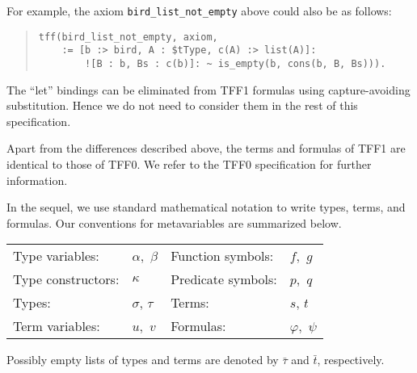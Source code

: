 %
For example, the axiom \verb+bird_list_not_empty+ above could also be as
follows:
\begin{quote}
\begin{verbatim}
tff(bird_list_not_empty, axiom,
    := [b :> bird, A : $tType, c(A) :> list(A)]:
        ![B : b, Bs : c(b)]: ~ is_empty(b, cons(b, B, Bs))).
\end{verbatim}
\end{quote}
%
The ``let'' bindings can be eliminated from TFF1 formulas using capture-avoiding
substitution. Hence we do not need to consider them in the rest of this
specification.

 Apart from the differences described above,
the terms and formulas of TFF1 are identical to those of TFF0. We refer to the
TFF0 specification \cite{TFF0} for further information.

 In the sequel, we use standard
mathematical notation to write types, terms, and formulas. Our conventions
for metavariables are summarized below.
%
\begin{center}
\begin{tabular}{l@{\enskip}l@{\qquad}l@{\enskip}l}
Type variables: & $\alpha,$ $\beta$ &
  Function symbols: & $f,$ $g$ \\
Type constructors: & $\kappa$ &
  Predicate symbols: & $p,$ $q$ \\
Types: & $\sigma$, $\tau$ &
  Terms: & $s$, $t$ \\
Term variables: & $u,$ $v$ &
  Formulas: & $\varphi,$ $\psi$
\end{tabular}
\end{center}
%
Possibly empty lists of types and terms are denoted by $\bar{\tau}$ and
$\bar{t}$, respectively.

